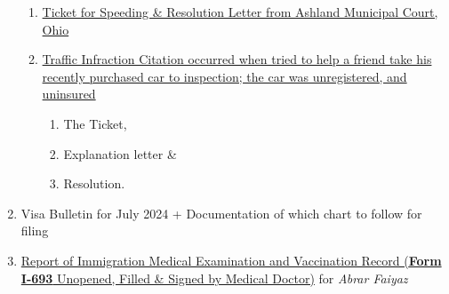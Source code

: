 \begin{enumerate}[label=\textbf{ Exhibit-\arabic*}]
    \begin{enumerate}[label=\roman*.]
        \item \hyperref[exhibit13a]{Ticket for Speeding \& Resolution Letter from Ashland Municipal Court, Ohio}
        \item \hyperref[exhibit13b]{Traffic Infraction Citation occurred when tried to help a friend take his recently purchased car to inspection; the car was unregistered, and uninsured}\begin{enumerate}[label=\alph*.]
        \item The Ticket, 
        \item Explanation letter \& 
        \item Resolution.
        \end{enumerate}
        
        
    \end{enumerate}

    \item Visa Bulletin for July 2024 + Documentation of which chart to follow for filing
    \item \hyperref[exhibit14]{Report of Immigration Medical Examination and Vaccination Record (\textbf{Form I-693} Unopened, Filled \& Signed by Medical Doctor)} for \textit{Abrar Faiyaz}
\end{enumerate}